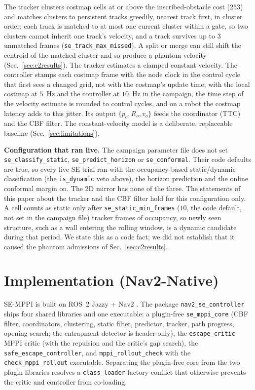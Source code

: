 \documentclass[journal]{IEEEtran}
\begin{document}
The tracker clusters costmap cells at or above the inscribed-obstacle cost ($253$) and
matches clusters to persistent tracks greedily, nearest track first, in cluster order; each
track is matched to at most one current cluster within a gate, so two clusters cannot inherit
one track's velocity, and a track survives up to $3$ unmatched frames
(\texttt{se\_track\_max\_missed}). A split or merge can still shift the centroid of the matched
cluster and so produce a phantom velocity (Sec.~\ref{sec:c2results}). The tracker estimates a
clamped constant velocity. The controller stamps each costmap frame with the node clock in
the control cycle that first sees a changed grid, not with the costmap's update time; with the
local costmap at $5$~Hz and the controller at $10$~Hz in the campaign, the time step of the
velocity estimate is rounded to control cycles, and on a robot the costmap latency adds to this
jitter. Its output $\{p_o, R_o, v_o\}$ feeds the
coordinator (TTC) and the CBF filter. The constant-velocity model is a
deliberate, replaceable baseline (Sec.~\ref{sec:limitations}).

\textbf{Configuration that ran live.} The campaign parameter file does not set
\texttt{se\_classify\_static}, \texttt{se\_predict\_horizon} or \texttt{se\_conformal}. Their
code defaults are true, so every live SE trial ran with the occupancy-based static/dynamic
classification (the \texttt{is\_dynamic} veto above), the horizon prediction and the online
conformal margin on. The 2D mirror has none of the three. The statements of this paper about the
tracker and the CBF filter hold for this configuration only. A cell counts as static only after
\texttt{se\_static\_min\_frames} ($10$, the code default, not set in the campaign file) tracker frames
of occupancy, so newly seen structure, such as a wall entering the rolling window, is a dynamic
candidate during that period. We state this as a code fact; we did not establish that it caused the
phantom admissions of Sec.~\ref{sec:c2results}.

\section{Implementation (Nav2-Native)}
\label{sec:implementation}

SE-MPPI is built on ROS~2 Jazzy + Nav2 \cite{nav2}. The package
\texttt{nav2\_se\_controller} ships four shared libraries and one executable: a plugin-free
\texttt{se\_mppi\_core} (CBF filter, coordinators, clustering, static filter, predictor,
tracker, path progress, opening search; the entrapment detector is header-only), the
\texttt{escape\_critic} MPPI critic (with the repulsion and the critic's gap search), the
\texttt{safe\_escape\_controller}, and \texttt{mppi\_rollout\_check} with the
\texttt{check\_mppi\_rollout} executable. Separating the plugin-free core from
the two plugin libraries resolves a \texttt{class\_loader} factory
conflict that otherwise prevents the critic and controller from
co-loading.
\end{document}
